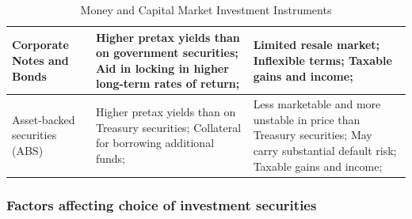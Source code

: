 \begin{table}[htbp]
\begin{tabularx}{\textwidth}{|X|X|X|}
    \hline
    Corporate Notes and Bonds & Higher pretax yields than on government securities; Aid in locking in higher long-term rates of return; & Limited resale market; Inflexible terms; Taxable gains and income; \\
    \hline
    Asset-backed securities (ABS) & Higher pretax yields than on Treasury securities; Collateral for borrowing additional funds; & Less marketable and more unstable in price than Treasury securities; May carry substantial default risk; Taxable gains and income; \\
    \hline
    \end{tabularx}
    \caption{Money and Capital Market Investment Instruments}
\end{table}



\subsubsection{Factors affecting choice of investment securities}
